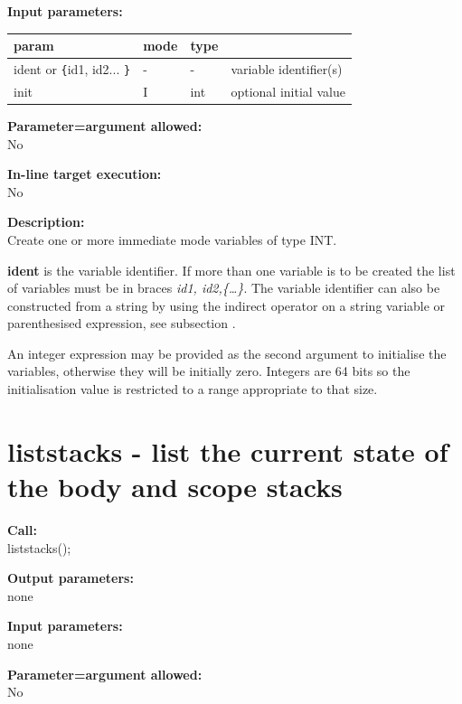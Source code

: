         {\bf Input parameters:} \\
        \begin{tabular}{| l | l | l | l |}
        \hline
        param  & mode & type & \\
        \hline \hline
        ident or \verb'{'id1, id2... \verb'}' & - &  -  & variable identifier(s)   \\ \hline
        init                   & I & int & optional initial value   \\ \hline
        \end{tabular}
        
        {\bf Parameter=argument allowed:} \\
        No
        
        {\bf In-line target execution:} \\
        No
        
        {\bf Description:} \\
        Create one or more immediate mode variables of type INT.
        
        {\bf ident} is the variable identifier. If more than one
        variable is to be created the list of variables must be in braces
        {\em id1, id2,\{\dots\}}. The variable identifier can also be constructed
        from a string by using the indirect operator on a string variable or
        parenthesised expression, see subsection .
        
        An integer expression may be provided as the second
        argument to initialise the variables, otherwise they will be
        initially zero. Integers are 64 bits so the initialisation value
        is restricted to a range appropriate to that size.



    \section{liststacks - list the current state of the body and scope stacks}\label{sec:ipliststt}
        
        {\bf Call:} \\
        liststacks();
        
        {\bf Output parameters:} \\
        none
        
        {\bf Input parameters:} \\
        none
        
        {\bf Parameter=argument allowed:} \\
        No
        
